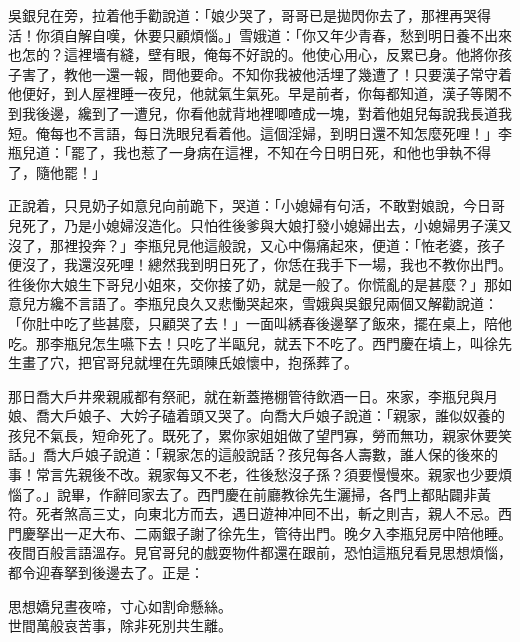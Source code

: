 吳銀兒在旁，拉着他手勸說道：「娘少哭了，哥哥已是拋閃你去了，那裡再哭得活！你須自解自嘆，休要只顧煩惱。」雪娥道：「你又年少青春，愁到明日養不出來也怎的？這裡墻有縫，壁有眼，俺每不好說的。他使心用心，反累已身。他將你孩子害了，教他一還一報，問他要命。不知你我被他活埋了幾遭了！只要漢子常守着他便好，到人屋裡睡一夜兒，他就氣生氣死。早是前者，你每都知道，漢子等閑不到我後邊，纔到了一遭兒，你看他就背地裡唧喳成一塊，對着他姐兒每說我長道我短。俺每也不言語，每日洗眼兒看着他。這個淫婦，到明日還不知怎麼死哩！」{}李瓶兒道：「罷了，我也惹了一身病在這裡，不知在今日明日死，和他也爭執不得了，隨他罷！」

正說着，只見奶子如意兒向前跪下，哭道：「小媳婦有句活，不敢對娘說，今日哥兒死了，乃是小媳婦沒造化。只怕徃後爹與大娘打發小媳婦出去，小媳婦男子漢又沒了，那裡投奔？」李瓶兒見他這般說，又心中傷痛起來，便道：「恠老婆，孩子便沒了，我還沒死哩！總然我到明日死了，你恁在我手下一場，我也不教你出門。徃後你大娘生下哥兒小姐來，交你接了奶，就是一般了。你慌亂的是甚麼？」那如意兒方纔不言語了。李瓶兒良久又悲慟哭起來，雪娥與吳銀兒兩個又解勸說道：「你肚中吃了些甚麼，只顧哭了去！」一面叫綉春後邊拏了飯來，擺在桌上，陪他吃。那李瓶兒怎生嚥下去！只吃了半甌兒，就丟下不吃了。西門慶在墳上，叫徐先生畫了穴，把官哥兒就埋在先頭陳氏娘懷中，抱孫葬了。

那日喬大戶井衆親戚都有祭祀，就在新蓋捲棚管待飲酒一日。來家，李瓶兒與月娘、喬大戶娘子、大妗子磕着頭又哭了。向喬大戶娘子說道：「親家，誰似奴養的孩兒不氣長，短命死了。既死了，累你家姐姐做了望門寡，勞而無功，親家休要笑話。」喬大戶娘子說道：「親家怎的這般說話？孩兒每各人壽數，誰人保的後來的事！常言先親後不改。親家每又不老，徃後愁沒子孫？須要慢慢來。親家也少要煩惱了。」說畢，作辭囘家去了。西門慶在前廳教徐先生灑掃，各門上都貼闢非黃符。死者煞高三丈，向東北方而去，遇日遊神冲囘不出，斬之則吉，親人不忌。西門慶拏出一疋大布、二兩銀子謝了徐先生，管待出門。晚夕入李瓶兒房中陪他睡。夜間百般言語溫存。見官哥兒的戲耍物件都還在跟前，恐怕這瓶兒看見思想煩惱，都令迎春拏到後邊去了。正是：

\begin{myquote} 
思想嬌兒晝夜啼，寸心如割命懸絲。\\世間萬般哀苦事，除非死別共生離。
\end{myquote} 

